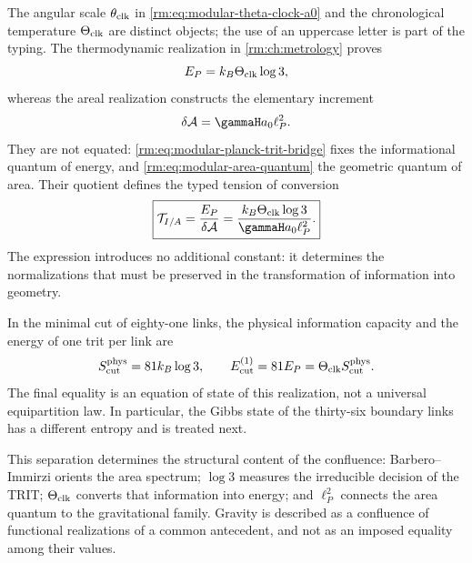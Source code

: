 The angular scale \(\theta_{\rm clk}\) in
\cref{rm:eq:modular-theta-clock-a0} and the chronological temperature
\(\Theta_{\rm clk}\) are distinct objects; the use of an uppercase letter is part
of the typing. The thermodynamic realization in \cref{rm:ch:metrology} proves
\begin{equation}
\label{rm:eq:modular-planck-trit-bridge}
E_P=k_B\Theta_{\rm clk}\log3,
\end{equation}
whereas the areal realization constructs the elementary increment
\begin{equation}
\label{rm:eq:modular-area-quantum}
\delta\mathcal A
=\gammaH a_0\ell_P^2.
\end{equation}
They are not equated: \cref{rm:eq:modular-planck-trit-bridge} fixes the informational quantum of energy, and \cref{rm:eq:modular-area-quantum} the geometric quantum of area. Their quotient defines the typed tension of conversion
\begin{equation}
\label{rm:eq:modular-information-area-tension}
\boxed{
\mathcal T_{I/A}
=\frac{E_P}{\delta\mathcal A}
=\frac{k_B\Theta_{\rm clk}\log3}
{\gammaH a_0\ell_P^2}.}
\end{equation}
The expression introduces no additional constant: it determines
the normalizations that must be preserved in the transformation
of information into geometry.


In the minimal cut of eighty-one links, the physical information capacity and the energy of one trit per link are
\begin{equation}
\label{rm:eq:modular-cut-info-energy}
S_{\rm cut}^{\rm phys}=81k_B\log3,
\qquad
E_{\rm cut}^{(1)}=81E_P
=\Theta_{\rm clk}S_{\rm cut}^{\rm phys}.
\end{equation}
The final equality is an equation of state of this realization, not a universal
equipartition law. In particular, the Gibbs state of the thirty-six
boundary links has a different entropy and is treated next.

This separation determines the structural content of the confluence:
Barbero--Immirzi
orients the area spectrum; \(\log3\) measures the irreducible decision of the
TRIT; \(\Theta_{\rm clk}\) converts that information into energy; and
\(\ell_P^2\) connects the area quantum to the gravitational family.
Gravity is described as a confluence of functional realizations of a
common antecedent, and not as an imposed equality among their values.
